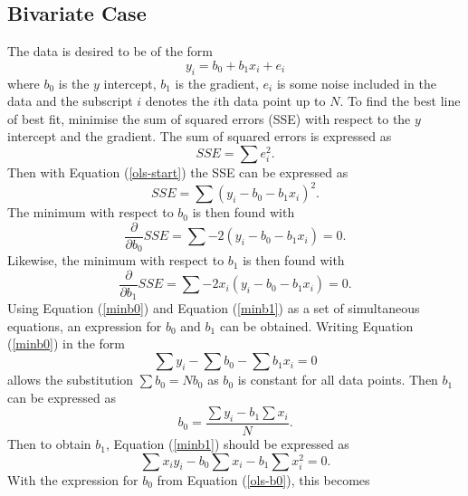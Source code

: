 \documentclass[12pt,a4paper]{report}
\begin{document}
		\subsection{Bivariate Case}
		The data is desired to be of the form
		\begin{equation}
			y_{i}=b_{0}+b_{1}x_{i}+e_{i}
			\label{ols-start}
		\end{equation}
		where $b_{0}$ is the $y$ intercept, $b_{1}$ is the gradient, $e_{i}$ is some noise included in the data and the subscript $i$ denotes the $i$th data point up to $N$. To find the best line of best fit, minimise the sum of squared errors (SSE) with respect to the $y$ intercept and the gradient. The sum of squared errors is expressed as
		\begin{equation}
			SSE=\sum e_{i}^{2}.
		\end{equation}
		Then with Equation (\ref{ols-start}) the SSE can be expressed as
		\begin{equation}
			SSE=\sum \left(y_{i}-b_{0}-b_{1}x_{i}\right)^{2}.
		\end{equation}
		The minimum with respect to $b_{0}$ is then found with
		\begin{equation}
			\frac{\partial}{\partial b_{0}}SSE=\sum -2\left(y_{i}-b_{0}-b_{1}x_{i}\right)=0.
			\label{minb0}
		\end{equation}
		Likewise, the minimum with respect to $b_{1}$ is then found with
		\begin{equation}
			\frac{\partial}{\partial b_{1}}SSE=\sum -2x_{i}\left(y_{i}-b_{0}-b_{1}x_{i}\right)=0.
			\label{minb1}
		\end{equation}
		Using Equation (\ref{minb0}) and Equation (\ref{minb1}) as a set of simultaneous equations, an expression for $b_{0}$ and $b_{1}$ can be obtained. Writing Equation (\ref{minb0}) in the form
		\begin{equation}
			\sum y_{i}-\sum b_{0}- \sum b_{1}x_{i}=0
		\end{equation}
		allows the substitution $\sum b_{0}=Nb_{0}$ as $b_{0}$ is constant for all data points. Then $b_{1}$ can be expressed as
		\begin{equation}
			b_{0}=\frac{\sum y_{i} -b_{1}\sum x_{i}}{N}.
			\label{ols-b0}
		\end{equation}
		Then to obtain $b_{1}$, Equation (\ref{minb1}) should be expressed as
		\begin{equation}
			\sum x_{i}y_{i}-b_{0}\sum x_{i}-b_{1}\sum x_{i}^{2}=0.
		\end{equation}
		With the expression for $b_{0}$ from Equation (\ref{ols-b0}), this becomes
\end{document}
